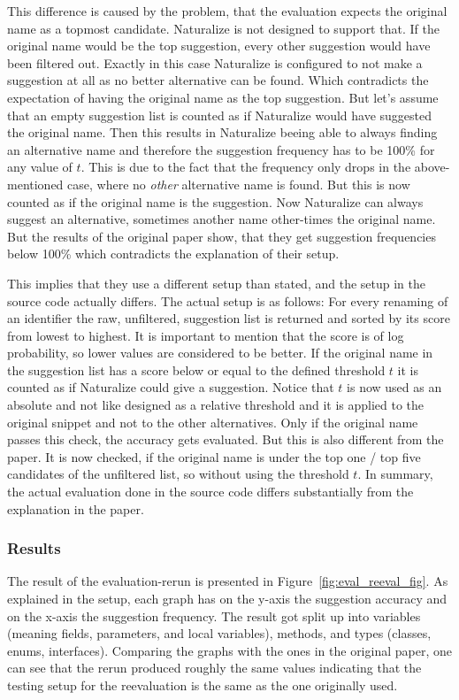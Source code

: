 This difference is caused by the problem, that the evaluation expects the original name as a topmost candidate. Naturalize is not designed to support that. If the original name would be the top suggestion, every other suggestion would have been filtered out. Exactly in this case Naturalize is configured to not make a suggestion at all as no better alternative can be found. Which contradicts the expectation of having the original name as the top suggestion. But let's assume that an empty suggestion list is counted as if Naturalize would have suggested the original name. Then this results in Naturalize beeing able to always finding an alternative name and therefore the suggestion frequency has to be 100\% for any value of $t$. This is due to the fact that the frequency only drops in the above-mentioned case, where no \emph{other} alternative name is found. But this is now counted as if the original name is the suggestion. Now Naturalize can always suggest an alternative, sometimes another name other-times the original name. But the results of the original paper show, that they get suggestion frequencies below 100\% which contradicts the explanation of their setup.

This implies that they use a different setup than stated, and the setup in the source code actually differs. The actual setup is as follows:
For every renaming of an identifier the raw, unfiltered, suggestion list is returned and sorted by its score from lowest to highest. It is important to mention that the score is of log probability, so lower values are considered to be better. If the original name in the suggestion list has a score below or equal to the defined threshold $t$ it is counted as if Naturalize could give a suggestion. Notice that $t$ is now used as an absolute and not like designed as a relative threshold and it is applied to the original snippet and not to the other alternatives. Only if the original name passes this check, the accuracy gets evaluated. But this is also different from the paper. It is now checked, if the original name is under the top one / top five candidates of the unfiltered list, so without using the threshold $t$. In summary, the actual evaluation done in the source code differs substantially from the explanation in the paper. 

\subsubsection{Results}

The result of the evaluation-rerun is presented in Figure~\ref{fig:eval_reeval_fig}.
As explained in the setup, each graph has on the y-axis the suggestion accuracy and on the x-axis the suggestion frequency. The result got split up into variables (meaning fields, parameters, and local variables), methods, and types (classes, enums, interfaces). Comparing the graphs with the ones in the original paper, one can see that the rerun produced roughly the same values indicating that the testing setup for the reevaluation is the same as the one originally used. 

